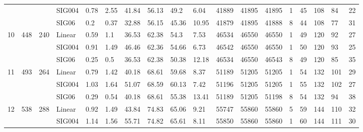 \begin{longtable}{llllllllllllllllll}
 &  &  & SIG004 & \num{0.78} & \num{2.55} & \num{41.84} & \num{56.13} & \num{49.2} & \num{6.04} & \num{41889} & \num{41895} & \num{41895} & \num{1} & \num{45} & \num{108} & \num{84} & \num{22} \\
 &  &  & SIG06 & \num{0.2} & \num{0.37} & \num{32.88} & \num{56.15} & \num{45.36} & \num{10.95} & \num{41879} & \num{41895} & \num{41888} & \num{8} & \num{44} & \num{108} & \num{77} & \num{31} \\
\cline{1-18} \cline{2-18} \cline{3-18}
\multirow[t]{3}{*}{10} & \multirow[t]{3}{*}{448} & \multirow[t]{3}{*}{240} & Linear & \num{0.59} & \num{1.1} & \num{36.53} & \num{62.38} & \num{54.3} & \num{7.53} & \num{46534} & \num{46550} & \num{46550} & \num{1} & \num{49} & \num{120} & \num{92} & \num{27} \\
 &  &  & SIG004 & \num{0.91} & \num{1.49} & \num{46.46} & \num{62.36} & \num{54.66} & \num{6.73} & \num{46542} & \num{46550} & \num{46550} & \num{1} & \num{50} & \num{120} & \num{93} & \num{25} \\
 &  &  & SIG06 & \num{0.25} & \num{0.5} & \num{36.53} & \num{62.38} & \num{50.38} & \num{12.18} & \num{46534} & \num{46550} & \num{46543} & \num{8} & \num{49} & \num{120} & \num{85} & \num{35} \\
\cline{1-18} \cline{2-18} \cline{3-18}
\multirow[t]{3}{*}{11} & \multirow[t]{3}{*}{493} & \multirow[t]{3}{*}{264} & Linear & \num{0.79} & \num{1.42} & \num{40.18} & \num{68.61} & \num{59.68} & \num{8.37} & \num{51189} & \num{51205} & \num{51205} & \num{1} & \num{54} & \num{132} & \num{101} & \num{29} \\
 &  &  & SIG004 & \num{1.03} & \num{1.64} & \num{51.07} & \num{68.59} & \num{60.13} & \num{7.42} & \num{51196} & \num{51205} & \num{51205} & \num{1} & \num{55} & \num{132} & \num{102} & \num{27} \\
 &  &  & SIG06 & \num{0.29} & \num{0.54} & \num{40.18} & \num{68.61} & \num{55.38} & \num{13.41} & \num{51189} & \num{51205} & \num{51198} & \num{8} & \num{54} & \num{132} & \num{94} & \num{38} \\
\cline{1-18} \cline{2-18} \cline{3-18}
\multirow[t]{3}{*}{12} & \multirow[t]{3}{*}{538} & \multirow[t]{3}{*}{288} & Linear & \num{0.92} & \num{1.49} & \num{43.84} & \num{74.83} & \num{65.06} & \num{9.21} & \num{55747} & \num{55860} & \num{55860} & \num{5} & \num{59} & \num{144} & \num{110} & \num{32} \\
 &  &  & SIG004 & \num{1.14} & \num{1.56} & \num{55.71} & \num{74.82} & \num{65.61} & \num{8.11} & \num{55850} & \num{55860} & \num{55860} & \num{1} & \num{60} & \num{144} & \num{111} & \num{30} \\

\end{longtable}

